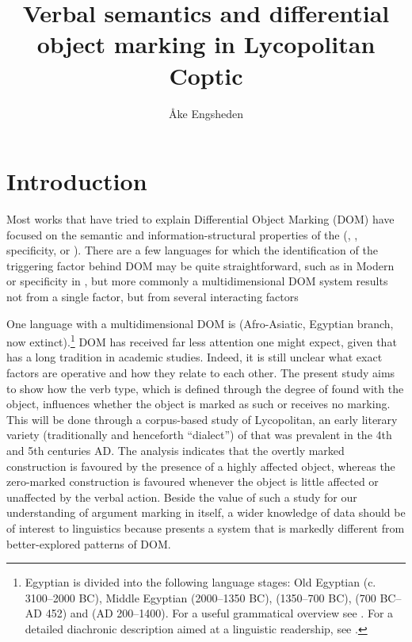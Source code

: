 \documentclass[output=paper]{LSP/langsci}
\author{Åke Engsheden\affiliation{Stockholm University, Department of Archaeology and Classical Studies}}
\title{Verbal semantics and differential object marking in Lycopolitan Coptic}
\begin{document}
\section{Introduction}
\label{06-en-sec:1}

Most works that have tried to explain Differential Object Marking (DOM) have focused on the semantic and information-structural properties of the  (, , specificity, or ). There are a few languages for which the identification of the triggering factor behind DOM may be quite straightforward, such as  in Modern  \citep{Danon2001Syntactic} or specificity in  \citep{Enc1991Semantics}, but more commonly a multidimensional DOM system results not from a single factor, but from several interacting factors %

One language with a multidimensional DOM is  (Afro-Asiatic, Egyptian branch, now extinct).\footnote{Egyptian is divided into the following language stages: Old Egyptian (c.\, 3100–2000 BC), Middle Egyptian (2000–1350 BC),  (1350–700 BC),  (700 BC–AD 452) and  (AD 200–1400). For a useful grammatical overview see \citet{Haspelmath2015Egyptian}. For a detailed diachronic description aimed at a linguistic readership, see \citet{Loprieno1995Egyptian}.}  DOM has received far less attention one might expect, given that  has a long tradition in academic studies. Indeed, it is still unclear what exact factors are operative and how they relate to each other. The present study aims to show how the verb type, which is defined through the degree of  found with the object, influences whether the object is marked as such or receives no marking. 
This will be done through a corpus-based study of Lycopolitan, an early literary variety (traditionally and henceforth “dialect”) of  that was prevalent in the 4th and 5th centuries AD. 
The analysis indicates that the overtly marked construction is favoured by the presence of a highly affected object, whereas the zero-marked construction is favoured whenever the object is little affected or unaffected by the verbal action. 
Beside the value of such a study for our understanding of argument marking in  itself, a wider knowledge of  data should be of interest to linguistics because  presents a system that is markedly different from better-explored patterns of DOM. 
\end{document}
